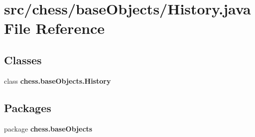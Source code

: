 \section{src/chess/base\+Objects/\+History.java File Reference}
\label{_history_8java}
\subsection*{Classes}
\begin{DoxyCompactItemize}
\item 
class {\bf chess.\+base\+Objects.\+History}
\end{DoxyCompactItemize}
\subsection*{Packages}
\begin{DoxyCompactItemize}
\item 
package {\bf chess.\+base\+Objects}
\end{DoxyCompactItemize}
